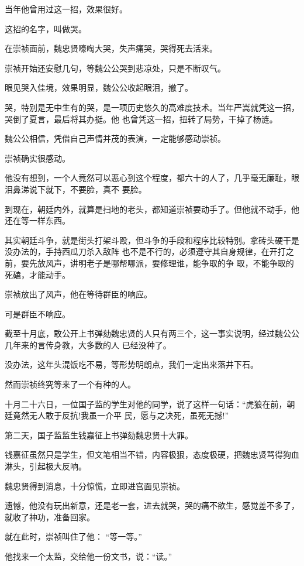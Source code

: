 \documentclass[11pt,a4paper,onecolumn]{article}
\begin{document}
当年他曾用过这一招，效果很好。

这招的名字，叫做哭。

在崇祯面前，魏忠贤嚎啕大哭，失声痛哭，哭得死去活来。

崇祯开始还安慰几句，等魏公公哭到悲凉处，只是不断叹气。

眼见哭入佳境，效果明显，魏公公收起眼泪，撤了。

哭，特别是无中生有的哭，是一项历史悠久的高难度技术。当年严嵩就凭这一招，哭倒了夏言，最后将其办挺。他
也曾凭这一招，扭转了局势，干掉了杨涟。

魏公公相信，凭借自己声情并茂的表演，一定能够感动崇祯。

崇祯确实很感动。

他没有想到，一个人竟然可以恶心到这个程度，都六十的人了，几乎毫无廉耻，眼泪鼻涕说下就下，不要脸，真不
要脸。

到现在，朝廷内外，就算是扫地的老头，都知道崇祯要动手了。但他就不动手，他还在等一样东西。

其实朝廷斗争，就是街头打架斗殴，但斗争的手段和程序比较特别。拿砖头硬干是没办法的，手持西瓜刀杀入敌阵
也不是不行的，必须遵守其自身规律，在开打之前，要先放风声，讲明老子是哪帮哪派，要修理谁，能争取的争
取，不能争取的死磕，才能动手。

崇祯放出了风声，他在等待群臣的响应。

可是群臣不响应。

截至十月底，敢公开上书弹劾魏忠贤的人只有两三个，这一事实说明，经过魏公公几年来的言传身教，大多数的人
已经没种了。

没办法，这年头混饭吃不易，等形势明朗点，我们一定出来落井下石。

然而崇祯终究等来了一个有种的人。

十月二十六日，一位国子监的学生对他的同学，说了这样一句话：``虎狼在前，朝廷竟然无人敢于反抗!我虽一介平
民，愿与之决死，虽死无撼!''

第二天，国子监监生钱嘉征上书弹劾魏忠贤十大罪。

钱嘉征虽然只是学生，但文笔相当不错，内容极狠，态度极硬，把魏忠贤骂得狗血淋头，引起极大反响。

魏忠贤得到消息，十分惊慌，立即进宫面见崇祯。

遗憾，他没有玩出新意，还是老一套，进去就哭，哭的痛不欲生，感觉差不多了，就收了神功，准备回家。

就在此时，崇祯叫住了他： ``等一等。''

他找来一个太监，交给他一份文书，说：``读。''

\section[\thesection]{}
\end{document}
